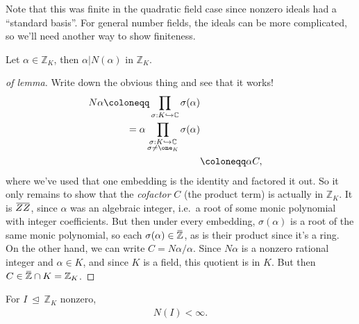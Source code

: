 \begin{remark}

Note that this was finite in the quadratic field case since nonzero
ideals had a ``standard basis''. For general number fields, the ideals
can be more complicated, so we'll need another way to show finiteness.

\end{remark}

\begin{lemma}[?]

Let \(\alpha\in {\mathbb{Z}}_K\), then
\(\alpha\mathrel{\Big|}N( \alpha)\) in \({\mathbb{Z}}_K\).

\end{lemma}

\begin{proof}[of lemma]

Write down the obvious thing and see that it works!
\begin{align*}
N \alpha 
\coloneqq\prod_{ \sigma: K \hookrightarrow{\mathbb{C}}} \sigma( \alpha) \\
= \alpha \prod_{ \substack{ \sigma: K \hookrightarrow{\mathbb{C}}\\ \sigma\neq \one_K } } \sigma( \alpha) \\
&\coloneqq\alpha C 
,\end{align*}
where we've used that one embedding is the identity and factored it out.
So it only remains to show that the \emph{cofactor} \(C\) (the product
term) is actually in \({\mathbb{Z}}_K\). It is
\(\mkern 1.5mu\overline{\mkern-1.5muZZ\mkern-1.5mu}\mkern 1.5mu\), since
\(\alpha\) was an algebraic integer, i.e.~a root of some monic
polynomial with integer coefficients. But then under every embedding,
\(\sigma( \alpha)\) is a root of the same monic polynomial, so each
\(\sigma( \alpha) \in \mkern 1.5mu\overline{\mkern-1.5mu{\mathbb{Z}}\mkern-1.5mu}\mkern 1.5mu\),
as is their product since it's a ring. On the other hand, we can write
\(C = N \alpha/ \alpha\). Since \(N \alpha\) is a nonzero rational
integer and \(\alpha\in K\), and since \(K\) is a field, this quotient
is in \(K\). But then
\(C \in \mkern 1.5mu\overline{\mkern-1.5mu{\mathbb{Z}}\mkern-1.5mu}\mkern 1.5mu \cap K = {\mathbb{Z}}_K\).

\end{proof}

\begin{proposition}[?]

For \(I{~\trianglelefteq~}{\mathbb{Z}}_K\) nonzero,
\begin{align*}
N(I) < \infty 
.\end{align*}

\end{proposition}

